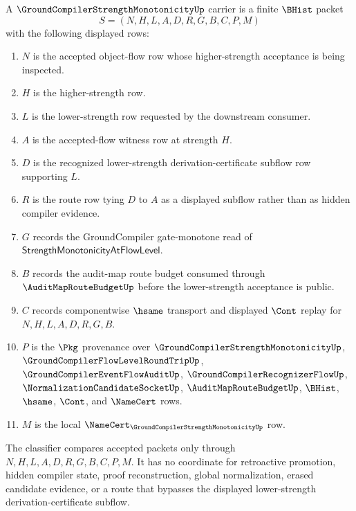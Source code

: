 \begin{definition}
\label{def:groundcompiler-strength-monotonicity-carrier}
A $\GroundCompilerStrengthMonotonicityUp$ carrier is a finite $\BHist$ packet
$$
S=(N,H,L,A,D,R,G,B,C,P,M)
$$
with the following displayed rows:
\begin{enumerate}
\item $N$ is the accepted object-flow row whose higher-strength acceptance is being inspected.
\item $H$ is the higher-strength row.
\item $L$ is the lower-strength row requested by the downstream consumer.
\item $A$ is the accepted-flow witness row at strength $H$.
\item $D$ is the recognized lower-strength derivation-certificate subflow row supporting $L$.
\item $R$ is the route row tying $D$ to $A$ as a displayed subflow rather than as hidden compiler evidence.
\item $G$ records the GroundCompiler gate-monotone read of $\mathsf{StrengthMonotonicityAtFlowLevel}$.
\item $B$ records the audit-map route budget consumed through $\AuditMapRouteBudgetUp$ before the lower-strength acceptance is public.
\item $C$ records componentwise $\hsame$ transport and displayed $\Cont$ replay for $N,H,L,A,D,R,G,B$.
\item $P$ is the $\Pkg$ provenance over $\GroundCompilerStrengthMonotonicityUp$, $\GroundCompilerFlowLevelRoundTripUp$, $\GroundCompilerEventFlowAuditUp$, $\GroundCompilerRecognizerFlowUp$, $\NormalizationCandidateSocketUp$, $\AuditMapRouteBudgetUp$, $\BHist$, $\hsame$, $\Cont$, and $\NameCert$ rows.
\item $M$ is the local $\NameCert_{\GroundCompilerStrengthMonotonicityUp}$ row.
\end{enumerate}
The classifier compares accepted packets only through $N,H,L,A,D,R,G,B,C,P,M$. It has no coordinate for retroactive promotion, hidden compiler state, proof reconstruction, global normalization, erased candidate evidence, or a route that bypasses the displayed lower-strength derivation-certificate subflow.
\end{definition}


